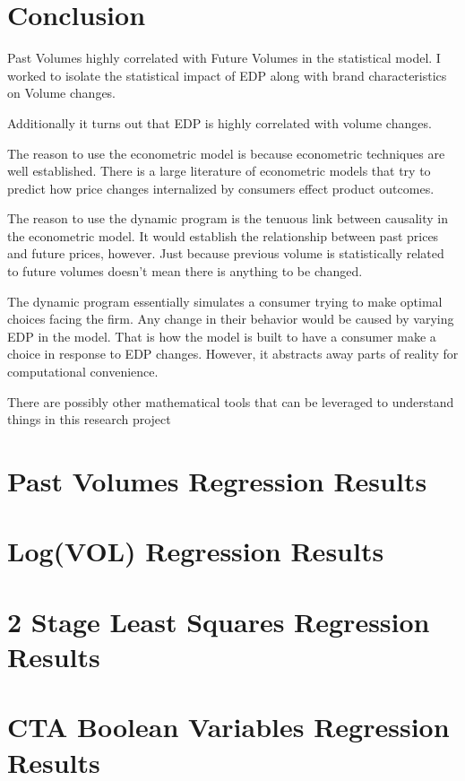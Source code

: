 \documentclass{article}
\begin{document}
\section{Conclusion}
Past Volumes highly correlated with Future Volumes in the statistical model. I worked to isolate the statistical impact of EDP along with brand characteristics on Volume changes.

Additionally it turns out that EDP is highly correlated with volume changes.

The reason to use the econometric model is because econometric techniques are well established. There is a large literature of econometric models that try to predict how price changes internalized by consumers effect product outcomes.

The reason to use the dynamic program is the tenuous link between causality in the econometric model. It would establish the relationship between past prices and future prices, however. Just because previous volume is statistically related to future volumes doesn't mean there is anything to be changed. 


The dynamic program essentially simulates a consumer trying to make optimal choices facing the firm. Any change in their behavior would be caused by varying EDP in the model. That is how the model is built to have a consumer make a choice in response to EDP changes. However, it abstracts away parts of reality for computational convenience.

There are possibly other mathematical tools that can be leveraged to understand things in this research project


\pagebreak

{}


\pagebreak

\begin{appendices}
\section{Past Volumes Regression Results}


\section{Log(VOL) Regression Results}


\section{2 Stage Least Squares Regression Results}


\section{CTA Boolean Variables Regression Results}



\end{appendices}
\end{document}
